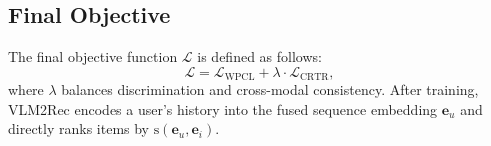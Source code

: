 


\subsection{Final Objective}
\label{sec:final_objective}
The final objective function $\mathcal{L}$ is defined as follows:
\begin{equation}
\mathcal{L} = \mathcal{L}_{\text{WPCL}} + \lambda \cdot \mathcal{L}_{\text{CRTR}},
\end{equation}
where $\lambda$ balances discrimination and cross-modal consistency.
After training, VLM2Rec encodes a user's history into the fused sequence embedding $\mathbf{e}_u$ and directly ranks items by $\text{s}(\mathbf{e}_u,\mathbf{e}_i)$.

